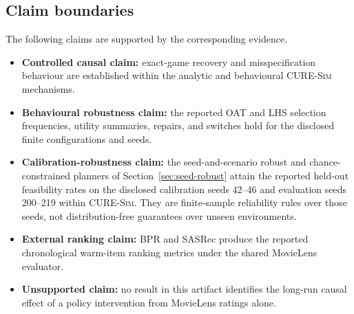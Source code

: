 \documentclass[review]{elsarticle}
\theoremstyle{plain}
\theoremstyle{definition}
\theoremstyle{remark}
\newcommand{\Sim}{\textsc{CURE-Sim}}
\begin{document}
\begin{appendices}
\section{Claim boundaries}\label{app:claims}
The following claims are supported by the corresponding evidence.
\begin{itemize}
\item \textbf{Controlled causal claim:} exact-game recovery and misspecification behaviour are established within the analytic and behavioural \Sim{} mechanisms.
\item \textbf{Behavioural robustness claim:} the reported OAT and LHS selection frequencies, utility summaries, repairs, and switches hold for the disclosed finite configurations and seeds.
\item \textbf{Calibration-robustness claim:} the seed-and-scenario robust and chance-constrained planners of Section~\ref{sec:seed-robust} attain the reported held-out feasibility rates on the disclosed calibration seeds 42--46 and evaluation seeds 200--219 within \Sim{}. They are finite-sample reliability rules over those seeds, not distribution-free guarantees over unseen environments.
\item \textbf{External ranking claim:} BPR and SASRec produce the reported chronological warm-item ranking metrics under the shared MovieLens evaluator.
\item \textbf{Unsupported claim:} no result in this artifact identifies the long-run causal effect of a policy intervention from MovieLens ratings alone.
\end{itemize}


\end{appendices}
\end{document}

